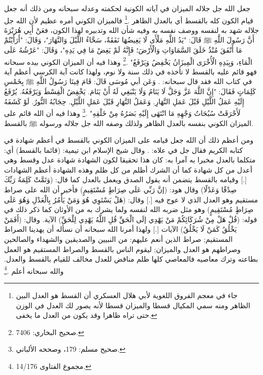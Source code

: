 جعل الله جل جلاله الميزان في آياته الكونية لحكمته وعدله سبحانه ومن ذلك أنه جعل قيام الكون كله بالقسط أي بالعدل الظاهر \href{https://shamela.ws/book/1736/428#p5}{\faExternalLink} \cite{askaari_Furuq}.\footnote{جاء في معجم الفروق اللغوية لأبي هلال العسكري  أن القسط هو العدل البين الظاهر ومنه سمي المكيال قسطا والميزان قسطا لأنه يصور لك العدل في الوزن حتى تراه ظاهرا وقد يكون من العدل ما يخفى.} فالميزان الكوني أمره عظيم لأن الله جل جلاله شهد به لنفسه ووصف نفسه به وفيه شأن الله وتدبيره لهذا الكون، فعَنْ أَبِي هُرَيْرَةَ أَنَّ رَسُولَ اللَّهِ ﷺ قَالَ: "يَدُ اللَّهِ مَلْأَى لَا يَغِيضُهَا نَفَقَةٌ، سَحَّاءُ اللَّيْلَ وَالنَّهَارَ"، وَقَالَ: "أَرَأَيْتُمْ مَا أَنْفَقَ مُنْذُ خَلَقَ السَّمَاوَاتِ وَالْأَرْضَ؛ فَإِنَّهُ لَمْ يَغِضْ مَا فِي يَدِهِ"، وَقَالَ: "عَرْشُهُ عَلَى الْمَاءِ، وَبِيَدِهِ الْأُخْرَى الْمِيزَانُ يَخْفِضُ وَيَرْفَعُ" \href{https://shamela.ws/book/1284/4620#p2}{\faExternalLink} \cite{bukhari}.\footnote{صحيح البخاري: 7406.} وهذا فيه أن الميزان الكوني بيده سبحانه فهو قائم عليه بالقسط لا تأخذه في ذلك سنة ولا نوم، ولهذا كانت آية الكرسي أعظم آية في كتاب الله فقد قال سبحانه:
\quranayah*[2][255][1-12] {\footnotesize (\surahname*[2])}. وَعَن أبي مُوسَى قَالَ: قَامَ فِينَا رَسُولُ اللَّهِ ﷺ بِخَمْسِ كَلِمَاتٍ فَقَالَ:  "إِنَّ اللَّهَ عَزَّ وَجَلَّ لَا يَنَامُ وَلَا يَنْبَغِي لَهُ أَنْ يَنَامَ. يَخْفِضُ الْقِسْطَ وَيَرْفَعُهُ. يُرْفَعُ إِلَيْهِ عَمَلُ اللَّيْلِ قَبْلَ عَمَلِ النَّهَارِ. وَعَمَلُ النَّهَارِ قَبْلَ عَمَلِ اللَّيْلِ. حِجَابُهُ النُّورُ.  لَوْ كَشَفَهُ لَأَحْرَقَتْ سُبُحَاتُ وَجْهِهِ مَا انْتَهَى إِلَيْهِ بَصَرُهُ مِنْ خَلْقِهِ" \href{https://shamela.ws/book/1727/393#p5}{\faExternalLink} \cite{muslim}.\footnote{صحيح مسلم: 179، وصححه الألباني.} وهذا فيه أن الله قائم على الميزان الكوني بنفسه بالعدل الظاهر ولذلك وصفه الله جل جلاله ورسوله ﷺ بالقسط.

ومن أعظم ذلك أن الله جعل قيامه على الميزان الكوني بالقسط في أعظم شهادة في كتابه الكريم فقال جل في علاه: \quranayah*[3][18]{\footnotesize \surahname*[3]}. وقال شيخ الإسلام ابن تيمية: (قائما بالقسط) أي: متكلما بالعدل مخبرا به آمرا به: كان هذا تحقيقا لكون الشهادة شهادة عدل وقسط وهي أعدل من كل شهادة كما أن الشرك أظلم من كل ظلم وهذه الشهادة أعظم الشهادات [.] وقيامه بالقسط يتضمن أنه يقول الصدق ويعمل بالعدل كما قال: (وَتَمَّتْ كَلِمَةُ رَبِّكَ صِدْقًا وَعَدْلًا) وقال هود: (إنَّ رَبِّي عَلَى صِرَاطٍ مُسْتَقِيمٍ) فأخبر أن الله على صراط مستقيم وهو العدل الذي لا عوج فيه [.] وقال: (هَلْ يَسْتَوِي هُوَ وَمَنْ يَأْمُرُ بِالْعَدْلِ وَهُوَ عَلَى صِرَاطٍ مُسْتَقِيمٍ) وهو مثل ضربه الله لنفسه ولما يشرك به من الأوثان كما ذكر ذلك في قوله: (قُلْ هَلْ مِنْ شُرَكَائِكُمْ مَنْ يَهْدِي إلَى الْحَقِّ قُلِ اللَّهُ يَهْدِي لِلْحَقِّ) الآية. وقال: (أَفَمَنْ يَخْلُقُ كَمَنْ لَا يَخْلُقُ) الآيات  [.] ولهذا أمرنا الله سبحانه أن نسأله أن يهدينا الصراط المستقيم; صراط الذين أنعم عليهم: من النبيين والصديقين والشهداء والصالحين وصراطهم هو العدل والميزان; ليقوم الناس بالقسط والصراط المستقيم هو العمل بطاعته وترك معاصيه فالمعاصي كلها ظلم مناقض للعدل مخالف للقيام بالقسط والعدل. والله سبحانه أعلم \href{https://shamela.ws/book/7289/7239#p1}{\faExternalLink} \cite{ibnTaimia_Majmoo}.\footnote{مجموع الفتاوى 14/176.}

